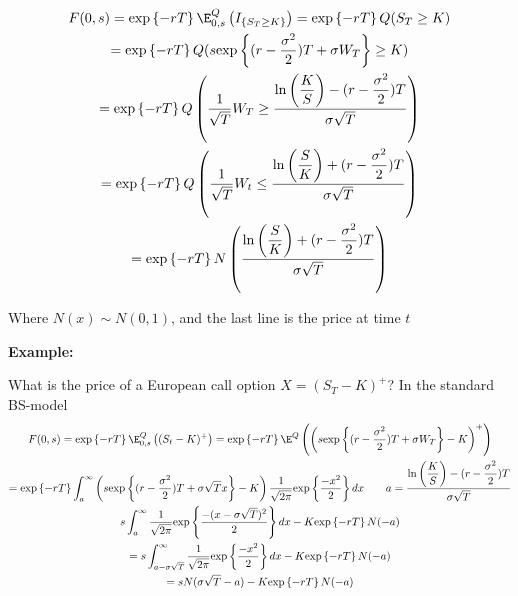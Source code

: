 \begin{equation*}
  \begin{gathered}
    F(0,s) = \text{exp}\left\{-rT\right\}\E_{0,s}^Q\left(I_{\left\{S_T\geq K\right\}}\right) = \text{exp}\left\{-rT\right\}Q(S_T\geq K)\\
  = \text{exp}\left\{-rT\right\}Q(s\text{exp}\left\{(r-\dfrac{\sigma^2}{2})T+\sigma W_T\right\}\geq K)\\
  = \text{exp}\left\{-rT\right\}Q\left(\dfrac{1}{\sqrt{T}}W_T\geq \dfrac{\ln{\left(\dfrac{K}{S}\right)}-(r-\dfrac{\sigma^2}{2})T}{\sigma\sqrt{T}}\right)\\
  = \text{exp}\left\{-rT\right\}Q\left(\dfrac{1}{\sqrt{T}}W_t\leq \dfrac{\ln{\left(\dfrac{S}{K}\right)}+(r-\dfrac{\sigma^2}{2})T}{\sigma\sqrt{T}}\right)\\
  = \text{exp}\left\{-rT\right\}N\left(\dfrac{\ln{\left(\dfrac{S}{K}\right)}+(r-\dfrac{\sigma^2}{2})T}{\sigma\sqrt{T}}\right)
  \end{gathered}
\end{equation*}\par
\noindent Where $N(x)\sim N(0,1)$, and the last line is the price at time $t$
\par\bigskip
\noindent\textbf{Example:}\par
\noindent What is the price of a European call option $ X= (S_T-K)^+$? In the standard BS-model
\begin{equation*}
  \begin{gathered}
    F(0,s) = \text{exp}\left\{-rT\right\}\E_{0,s}^Q\left((S_t-K)^+\right) = \text{exp}\left\{-rT\right\}\E^Q\left(\left(s\text{exp}\left\{(r-\dfrac{\sigma^2}{2})T+\sigma W_T\right\}-K\right)^+\right)\\
    = \text{exp}\left\{-rT\right\}\int_{a}^{\infty}\left(s\text{exp}\left\{(r-\dfrac{\sigma^2}{2})T+\sigma\sqrt{T}x\right\}-K\right)\dfrac{1}{\sqrt{2\pi}}\text{exp}\left\{\dfrac{-x^2}{2}\right\}dx\qquad a = \dfrac{\ln{\left(\dfrac{K}{S}\right)}-(r-\dfrac{\sigma^2}{2})T}{\sigma\sqrt{T}}\\
    s \int_{a}^{\infty}\dfrac{1}{\sqrt{2\pi}}\text{exp}\left\{\dfrac{-(x-\sigma\sqrt{T})^2}{2}\right\}dx-K\text{exp}\left\{-rT\right\}N(-a)\\
    =s \int_{a-\sigma\sqrt{T}}^{\infty}\dfrac{1}{\sqrt{2\pi}}\text{exp}\left\{\dfrac{-x^2}{2}\right\}dx-K\text{exp}\left\{-rT\right\}N(-a)\\
    = sN(\sigma\sqrt{T}-a)-K\text{exp}\left\{-rT\right\}N(-a)
  \end{gathered}
\end{equation*}
